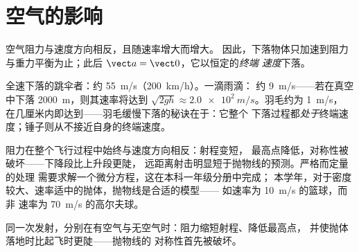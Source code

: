 \section{空气的影响}

\begin{definition}[终端速度]\label{def:g12:projectile-motion:terminal}
空气阻力与速度方向相反，且随速率增大而增大。
因此，下落物体只加速到阻力与重力平衡为止；此后
$\vect a = \vect 0$，它以恒定的\emph{终端
速度}下落。
\end{definition}

\begin{example}[终端速度的数量级]\label{ex:g12:projectile-motion:airorders}
全速下落的跳伞者：约 \qty{55}{m/s}（\qty{200}{km/h}）。一滴雨滴：
约 \qty{9}{m/s}——若在真空中下落 \qty{2000}{m}，则其速率将达到
$\sqrt{2gh} \approx \qty{2.0e2}{m/s}$。羽毛约为 \qty{1}{m/s}，
在几厘米内即达到——羽毛缓慢下落的秘诀在于：它整个
下落过程都\emph{处于}终端速度；锤子则从不接近自身的终端速度。
\end{example}

\begin{remark}[真实弹道]\label{rem:g12:projectile-motion:drag}
阻力在整个飞行过程中始终与速度方向相反：射程变短，
最高点降低，对称性被破坏——下降段比上升段更陡，
远距离射击明显短于抛物线的预测。严格而定量的处理
需要求解一个微分方程，这在本科一年级分册中完成；
本学年，对于密度较大、速率适中的抛体，抛物线是合适的模型——
如速率为 \qty{10}{m/s} 的篮球，而非
速率为 \qty{70}{m/s} 的高尔夫球。
\end{remark}

\begin{omfigure}

{\small 同一次发射，分别在有空气与无空气时：阻力缩短射程、降低最高点，
并使抛体落地时比起飞时更陡——抛物线的
对称性首先被破坏。}
\end{omfigure}

